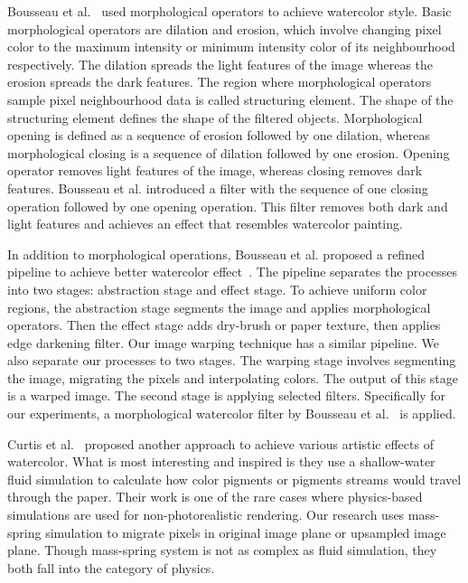 Bousseau et al.~\cite{Bousseau:2007} used morphological operators to achieve watercolor style. Basic morphological operators are dilation and erosion, which involve changing pixel color to the maximum intensity or minimum intensity color of its neighbourhood respectively. The dilation spreads the light features of the image whereas the erosion spreads the dark features. The region where morphological operators sample pixel neighbourhood data is called structuring element. The shape of the structuring element defines the shape of the filtered objects. Morphological opening is defined as a sequence of erosion followed by one dilation, whereas morphological closing is a sequence of dilation followed by one erosion. Opening operator removes light features of the image, whereas closing removes dark features. Bousseau et al. introduced a filter with the sequence of one closing operation followed by one opening operation. This filter removes both dark and light features and achieves an effect that resembles watercolor painting.

In addition to morphological operations, Bousseau et al. proposed a refined pipeline to achieve better watercolor effect~\cite{Bousseau:2006}. The pipeline separates the processes into two stages: abstraction stage and effect stage. To achieve uniform color regions, the abstraction stage segments the image and applies morphological operators. Then the effect stage adds dry-brush or paper texture, then applies edge darkening filter. Our image warping technique has a similar pipeline. We also separate our processes to two stages. The warping stage involves segmenting the image, migrating the pixels and interpolating colors. The output of this stage is a warped image. The second stage is applying selected filters. Specifically for our experiments, a morphological watercolor filter by Bousseau et al.~\cite{Bousseau:2007} is applied.

Curtis et al.~\cite{curtis} proposed another approach to achieve various artistic effects of watercolor. What is most interesting and inspired is they use a shallow-water fluid simulation to calculate how color pigments or pigments streams would travel through the paper. Their work is one of the rare cases where physics-based simulations are used for non-photorealistic rendering.  Our research uses mass-spring simulation to migrate pixels in original image plane or upsampled image plane. Though mass-spring system is not as complex as fluid simulation, they both fall into the category of physics.

